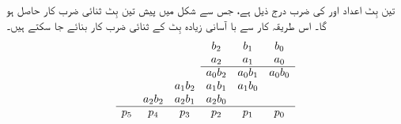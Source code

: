 تین بِٹ اعداد  اور  کی ضرب درج ذیل ہے، جس سے شکل  میں پیش تین بِٹ ثنائی ضرب کار حاصل ہو گا۔ اس طریقہ کار سے با آسانی زیادہ بِٹ کے ثنائی ضرب کار بنائے جا سکتے ہیں۔
\begin{gather}
\begin{aligned}\label{مساوات_ترکیبی_تین_بٹ_ضرب_کار}
\begin{array}{cccccc}
&&&b_2& b_1&b_0\\
&&&a_2& a_1&a_0\\
\cline{4-6}
&&&a_0b_2& a_0b_1&a_0b_0\\
&&a_1b_2&a_1b_1&a_1b_0&\\
&a_2b_2&a_2b_1&a_2b_0&\\
\cline{1-6}
p_5&p_4&p_3&p_2&p_1&p_0
\end{array}
\end{aligned}
\end{gather}
%
